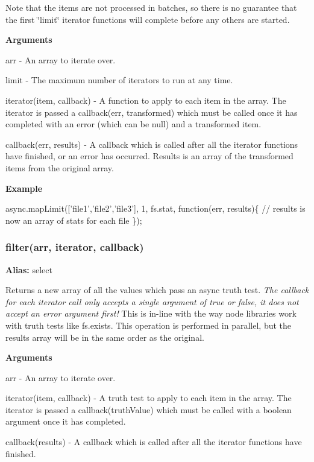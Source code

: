 Note that the items are not processed in batches, so there is no guarantee that the first \char`\"{}limit\char`\"{} iterator functions will complete before any others are started.

{\bfseries Arguments}


\begin{DoxyItemize}
\item arr -\/ An array to iterate over.
\item limit -\/ The maximum number of iterators to run at any time.
\item iterator(item, callback) -\/ A function to apply to each item in the array. The iterator is passed a callback(err, transformed) which must be called once it has completed with an error (which can be null) and a transformed item.
\item callback(err, results) -\/ A callback which is called after all the iterator functions have finished, or an error has occurred. Results is an array of the transformed items from the original array.
\end{DoxyItemize}

{\bfseries Example}


\begin{DoxyCode}
async.mapLimit([\textcolor{stringliteral}{'file1'},\textcolor{stringliteral}{'file2'},\textcolor{stringliteral}{'file3'}], 1, fs.stat, \textcolor{keyword}{function}(err, results)\{
    \textcolor{comment}{// results is now an array of stats for each file}
\});
\end{DoxyCode}
 



\label{_filter}%
 \subsubsection*{filter(arr, iterator, callback)}

{\bfseries Alias\+:} select

Returns a new array of all the values which pass an async truth test. {\itshape The callback for each iterator call only accepts a single argument of true or false, it does not accept an error argument first!} This is in-\/line with the way node libraries work with truth tests like fs.\+exists. This operation is performed in parallel, but the results array will be in the same order as the original.

{\bfseries Arguments}


\begin{DoxyItemize}
\item arr -\/ An array to iterate over.
\item iterator(item, callback) -\/ A truth test to apply to each item in the array. The iterator is passed a callback(truth\+Value) which must be called with a boolean argument once it has completed.
\item callback(results) -\/ A callback which is called after all the iterator functions have finished.
\end{DoxyItemize}

